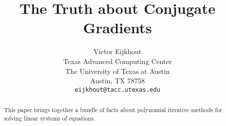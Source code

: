 \documentclass[11pt]{artikel3}
\begin{document}
\title{The Truth about Conjugate Gradients}
\author{Victor Eijkhout 
\\ Texas Advanced Computing Center \\ The University of Texas at Austin 
\\ Austin, TX 78758 \\ {\tt eijkhout@tacc.utexas.edu} }
\maketitle

\begin{abstract}
This paper brings together a bundle of facts about polynomial
iterative methods for solving linear systems of equations.
\end{abstract}

\tableofcontents
\pagebreak
\listofstatements
\pagebreak
\end{document}
